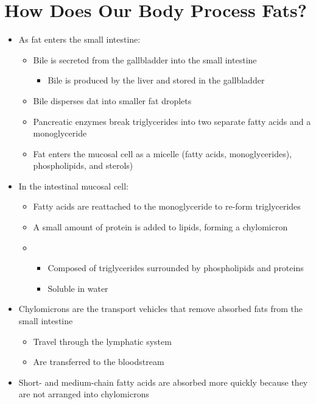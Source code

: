 \documentclass[title={Chapter 5}]{fdsn201notes}
\begin{document}
\section{How Does Our Body Process Fats?}\label{sec:how-does-our-body-process-fats?}
\begin{itemize}
	\item As fat enters the small intestine:
	\begin{itemize}
		\item Bile is secreted from the gallbladder into the small intestine
		\begin{itemize}
			\item Bile is produced by the liver and stored in the gallbladder
		\end{itemize}
		\item Bile disperses dat into smaller fat droplets
		\item Pancreatic enzymes break triglycerides into two separate fatty acids and a monoglyceride
		\item Fat enters the mucosal cell as a micelle (fatty acids, monoglycerides), phospholipids, and sterols)
	\end{itemize}
	\item In the intestinal mucosal cell:
	\begin{itemize}
		\item Fatty acids are reattached to the monoglyceride to re-form triglycerides
		\item A small amount of protein is added to lipids, forming a chylomicron
		\item {}
		\begin{itemize}
			\item Composed of triglycerides surrounded by phospholipids and proteins
			\item Soluble in water
		\end{itemize}
	\end{itemize}
	\item Chylomicrons are the transport vehicles that remove absorbed fats from the small intestine
	\begin{itemize}
		\item Travel through the lymphatic system
		\item Are transferred to the bloodstream
	\end{itemize}
	\item Short- and medium-chain fatty acids are absorbed more quickly because they are not arranged into chylomicrons

\end{itemize}
\end{document}
